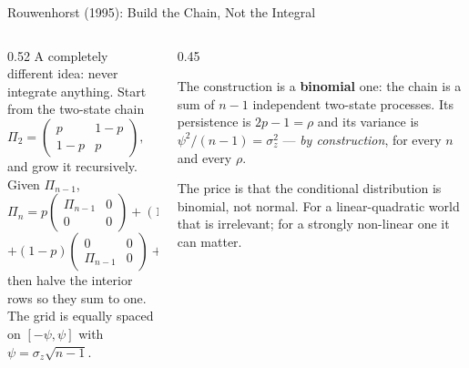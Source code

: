 \begin{frame}{Rouwenhorst (1995): Build the Chain, Not the Integral}
\begin{columns}[T]
\begin{column}{0.52\textwidth}
\small
A completely different idea: never integrate anything. Start from the two-state chain
\[
  \Pi_2=\begin{pmatrix}p & 1-p\\ 1-p & p\end{pmatrix},
  \qquad p=\frac{1+\rho}{2},
\]
and grow it recursively. Given $\Pi_{n-1}$,
\[
  \Pi_n=p\begin{pmatrix}\Pi_{n-1}&0\\0&0\end{pmatrix}
       +(1-p)\begin{pmatrix}0&\Pi_{n-1}\\0&0\end{pmatrix}
\]
\[
  +(1-p)\begin{pmatrix}0&0\\ \Pi_{n-1}&0\end{pmatrix}
       +p\begin{pmatrix}0&0\\0&\Pi_{n-1}\end{pmatrix},
\]
then halve the interior rows so they sum to one. The grid is equally spaced on $[-\psi,\psi]$ with $\psi=\sigma_z\sqrt{n-1}$.
\end{column}
\begin{column}{0.45\textwidth}
\begin{takeawaybox}[title=\textbf{Why it is exact}]\small
The construction is a \textbf{binomial} one: the chain is a sum of $n-1$ independent two-state processes. Its persistence is $2p-1=\rho$ and its variance is $\psi^{2}/(n-1)=\sigma_z^{2}$ --- \emph{by construction}, for every $n$ and every $\rho$.
\end{takeawaybox}
\medskip
\begin{cautionbox}\footnotesize
The price is that the conditional distribution is binomial, not normal. For a linear-quadratic world that is irrelevant; for a strongly non-linear one it can matter.
\end{cautionbox}
\end{column}
\end{columns}
\vspace{1mm}
\end{frame}

